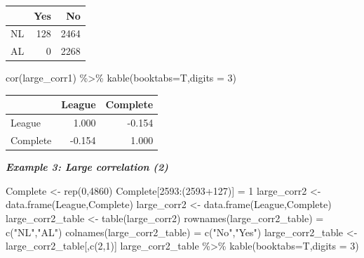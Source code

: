 \documentclass[
  11pt,
]{book}
\newenvironment{Shaded}{\begin{snugshade}}{\end{snugshade}}
\newcommand{\AttributeTok}[1]{\textcolor[rgb]{0.77,0.63,0.00}{#1}}
\newcommand{\DecValTok}[1]{\textcolor[rgb]{0.00,0.00,0.81}{#1}}
\newcommand{\FunctionTok}[1]{\textcolor[rgb]{0.00,0.00,0.00}{#1}}
\newcommand{\NormalTok}[1]{#1}
\newcommand{\OtherTok}[1]{\textcolor[rgb]{0.56,0.35,0.01}{#1}}
\newcommand{\SpecialCharTok}[1]{\textcolor[rgb]{0.00,0.00,0.00}{#1}}
\newcommand{\StringTok}[1]{\textcolor[rgb]{0.31,0.60,0.02}{#1}}
\theoremstyle{definition}
\theoremstyle{definition}
\theoremstyle{definition}
\theoremstyle{definition}
\theoremstyle{remark}
\begin{document}
\begin{tabular}{lrr}
\toprule
  & Yes & No\\
\midrule
NL & 128 & 2464\\
AL & 0 & 2268\\
\bottomrule
\end{tabular}

\begin{Shaded}
\begin{Highlighting}[]
\FunctionTok{cor}\NormalTok{(large\_corr1) }\SpecialCharTok{\%\textgreater{}\%} \FunctionTok{kable}\NormalTok{(}\AttributeTok{booktabs=}\NormalTok{T,}\AttributeTok{digits =} \DecValTok{3}\NormalTok{)}
\end{Highlighting}
\end{Shaded}

\begin{tabular}{lrr}
\toprule
  & League & Complete\\
\midrule
League & 1.000 & -0.154\\
Complete & -0.154 & 1.000\\
\bottomrule
\end{tabular}

\textbf{\emph{Example 3: Large correlation (2)}}\\

\begin{Shaded}
\begin{Highlighting}[]
\NormalTok{Complete }\OtherTok{\textless{}{-}} \FunctionTok{rep}\NormalTok{(}\DecValTok{0}\NormalTok{,}\DecValTok{4860}\NormalTok{)}
\NormalTok{Complete[}\DecValTok{2593}\SpecialCharTok{:}\NormalTok{(}\DecValTok{2593}\SpecialCharTok{+}\DecValTok{127}\NormalTok{)] }\OtherTok{=} \DecValTok{1}
\NormalTok{large\_corr2 }\OtherTok{\textless{}{-}} \FunctionTok{data.frame}\NormalTok{(League,Complete)}
\NormalTok{large\_corr2 }\OtherTok{\textless{}{-}} \FunctionTok{data.frame}\NormalTok{(League,Complete)}
\NormalTok{large\_corr2\_table }\OtherTok{\textless{}{-}} \FunctionTok{table}\NormalTok{(large\_corr2)}
\FunctionTok{rownames}\NormalTok{(large\_corr2\_table) }\OtherTok{=} \FunctionTok{c}\NormalTok{(}\StringTok{"NL"}\NormalTok{,}\StringTok{"AL"}\NormalTok{)}
\FunctionTok{colnames}\NormalTok{(large\_corr2\_table) }\OtherTok{=} \FunctionTok{c}\NormalTok{(}\StringTok{"No"}\NormalTok{,}\StringTok{"Yes"}\NormalTok{)}
\NormalTok{large\_corr2\_table }\OtherTok{\textless{}{-}}\NormalTok{ large\_corr2\_table[,}\FunctionTok{c}\NormalTok{(}\DecValTok{2}\NormalTok{,}\DecValTok{1}\NormalTok{)]}
\NormalTok{large\_corr2\_table }\SpecialCharTok{\%\textgreater{}\%} \FunctionTok{kable}\NormalTok{(}\AttributeTok{booktabs=}\NormalTok{T,}\AttributeTok{digits =} \DecValTok{3}\NormalTok{)}
\end{Highlighting}
\end{Shaded}
\end{document}
